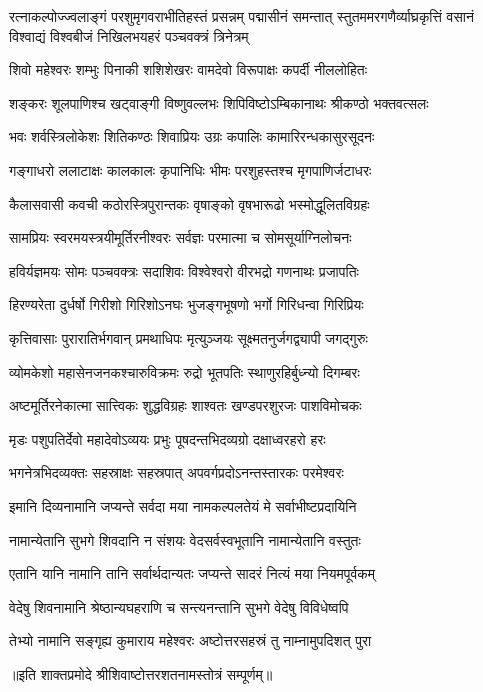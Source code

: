 

{रत्नाकल्पोज्ज्वलाङ्गं परशुमृगवराभीतिहस्तं प्रसन्नम्}
{पद्मासीनं समन्तात् स्तुतममरगणैर्व्याघ्रकृत्तिं वसानं}
{विश्वाद्यं विश्वबीजं निखिलभयहरं पञ्चवक्त्रं त्रिनेत्रम्}

\twolineshloka
{शिवो महेश्वरः शम्भुः पिनाकी शशिशेखरः}
{वामदेवो विरूपाक्षः कपर्दी नीललोहितः}

\twolineshloka
{शङ्करः शूलपाणिश्च खट्वाङ्गी विष्णुवल्लभः}
{शिपिविष्टोऽम्बिकानाथः श्रीकण्ठो भक्तवत्सलः}

\twolineshloka
{भवः शर्वस्त्रिलोकेशः शितिकण्ठः शिवाप्रियः}
{उग्रः कपालिः कामारिरन्धकासुरसूदनः}

\twolineshloka
{गङ्गाधरो ललाटाक्षः कालकालः कृपानिधिः}
{भीमः परशुहस्तश्च मृगपाणिर्जटाधरः}

\twolineshloka
{कैलासवासी कवची कठोरस्त्रिपुरान्तकः}
{वृषाङ्को वृषभारूढो भस्मोद्धूलितविग्रहः}

\twolineshloka
{सामप्रियः स्वरमयस्त्रयीमूर्तिरनीश्वरः}
{सर्वज्ञः परमात्मा च सोमसूर्याग्निलोचनः}

\twolineshloka
{हविर्यज्ञमयः सोमः पञ्चवक्त्रः सदाशिवः}
{विश्वेश्वरो वीरभद्रो गणनाथः प्रजापतिः}

\twolineshloka
{हिरण्यरेता दुर्धर्षो गिरीशो गिरिशोऽनघः}
{भुजङ्गभूषणो भर्गो गिरिधन्वा गिरिप्रियः}

\twolineshloka
{कृत्तिवासाः पुरारातिर्भगवान् प्रमथाधिपः}
{मृत्युञ्जयः सूक्ष्मतनुर्जगद्व्यापी जगद्गुरुः}

\twolineshloka
{व्योमकेशो महासेनजनकश्चारुविक्रमः}
{रुद्रो भूतपतिः स्थाणुरहिर्बुध्न्यो दिगम्बरः}

\twolineshloka
{अष्टमूर्तिरनेकात्मा सात्त्विकः शुद्धविग्रहः}
{शाश्वतः खण्डपरशुरजः पाशविमोचकः}

\twolineshloka
{मृडः पशुपतिर्देवो महादेवोऽव्ययः प्रभुः}
{पूषदन्तभिदव्यग्रो दक्षाध्वरहरो हरः}

\twolineshloka
{भगनेत्रभिदव्यक्तः सहस्राक्षः सहस्रपात्}
{अपवर्गप्रदोऽनन्तस्तारकः परमेश्वरः}

\twolineshloka
{इमानि दिव्यनामानि जप्यन्ते सर्वदा मया}
{नामकल्पलतेयं मे सर्वाभीष्टप्रदायिनि}

\twolineshloka
{नामान्येतानि सुभगे शिवदानि न संशयः}
{वेदसर्वस्वभूतानि नामान्येतानि वस्तुतः}

\twolineshloka
{एतानि यानि नामानि तानि सर्वार्थदान्यतः}
{जप्यन्ते सादरं नित्यं मया नियमपूर्वकम्}

\twolineshloka
{वेदेषु शिवनामानि श्रेष्ठान्यघहराणि च}
{सन्त्यनन्तानि सुभगे वेदेषु विविधेष्वपि}

\twolineshloka
{तेभ्यो नामानि सङ्गृह्य कुमाराय महेश्वरः}
{अष्टोत्तरसहस्रं तु नाम्नामुपदिशत् पुरा}

{॥इति शाक्तप्रमोदे श्रीशिवाष्टोत्तरशतनामस्तोत्रं सम्पूर्णम्॥}